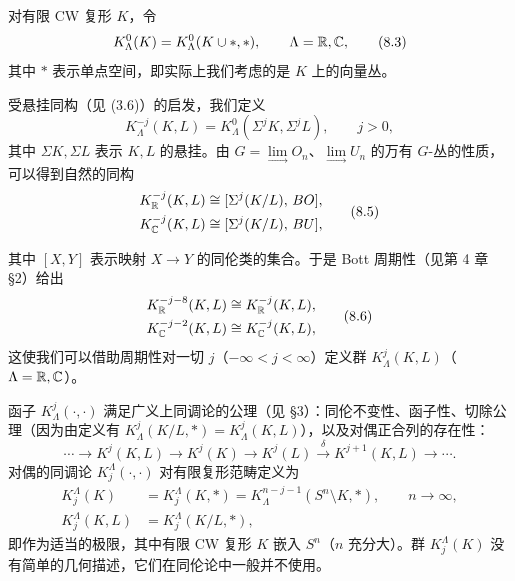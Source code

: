 对有限 CW 复形 $K$，令
\begin{equation}
K_\Lambda^0(K)=K_\Lambda^0(K\cup*,*),\qquad \Lambda=\mathbb{R},\mathbb{C}, \tag{8.3}
\end{equation}
其中 $*$ 表示单点空间，即实际上我们考虑的是 $K$ 上的向量丛。

受悬挂同构（见 (3.6)）的启发，我们定义
\begin{equation}
K_\Lambda^{-j}(K,L)=K_\Lambda^0(\Sigma^jK,\Sigma^jL),\qquad j>0, \tag{8.4}
\end{equation}
其中 $\Sigma K,\Sigma L$ 表示 $K,L$ 的悬挂。由 $G=\lim\limits_{\longrightarrow}O_n$、$\lim\limits_{\longrightarrow}U_n$ 的万有 $G$-丛的性质，可以得到自然的同构
\begin{equation}
\begin{aligned}
K_{\mathbb{R}}^{-j}(K,L)&\cong[\Sigma^j(K/L),\,BO],\\
K_{\mathbb{C}}^{-j}(K,L)&\cong[\Sigma^j(K/L),\,BU],
\end{aligned}
\tag{8.5}
\end{equation}

其中 $[X,Y]$ 表示映射 $X\to Y$ 的同伦类的集合。于是 Bott 周期性（见第 4 章 §2）给出
\begin{equation}
\begin{aligned}
K_{\mathbb{R}}^{-j-8}(K,L)&\cong K_{\mathbb{R}}^{-j}(K,L),\\
K_{\mathbb{C}}^{-j-2}(K,L)&\cong K_{\mathbb{C}}^{-j}(K,L),
\end{aligned}
\tag{8.6}
\end{equation}
这使我们可以借助周期性对一切 $j$（$-\infty<j<\infty$）定义群 $K_\Lambda^j(K,L)$（$\Lambda=\mathbb{R},\mathbb{C}$）。

函子 $K_\Lambda^j(\cdot,\cdot)$ 满足广义上同调论的公理（见 §3）：同伦不变性、函子性、切除公理（因为由定义有 $K_\Lambda^j(K/L,*)=K_\Lambda^j(K,L)$），以及对偶正合列的存在性：
\begin{equation}
\cdots\longrightarrow K^j(K,L)\longrightarrow K^j(K)\longrightarrow K^j(L)\xrightarrow{\delta}K^{j+1}(K,L)\longrightarrow\cdots . \tag{8.7}
\end{equation}
对偶的同调论 $K_j^\Lambda(\cdot,\cdot)$ 对有限复形范畴定义为
\begin{equation}
\begin{aligned}
K_j^\Lambda(K)&=K_j^\Lambda(K,*)=K_\Lambda^{n-j-1}(S^n\setminus K,*),\qquad n\to\infty,\\
K_j^\Lambda(K,L)&=K_j^\Lambda(K/L,*),
\end{aligned}
\tag{8.8}
\end{equation}
即作为适当的极限，其中有限 CW 复形 $K$ 嵌入 $S^n$（$n$ 充分大）。群 $K_j^\Lambda(K)$ 没有简单的几何描述，它们在同伦论中一般并不使用。

